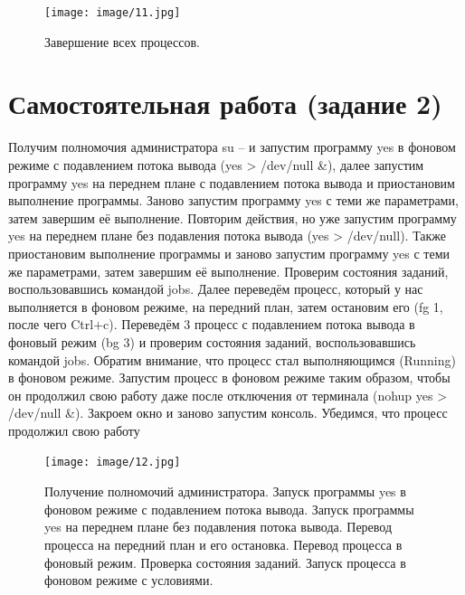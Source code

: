 \documentclass[
  english,
  russian,
  12pt,
  a4paper,
  DIV=11,
  numbers=noendperiod]{scrreprt}
\begin{document}
\begin{figure}

{\centering \texttt{[image: image/11.jpg]}

}

\caption{Завершение всех процессов.}

\end{figure}%

\section{Самостоятельная работа (задание
2)}\label{ux441ux430ux43cux43eux441ux442ux43eux44fux442ux435ux43bux44cux43dux430ux44f-ux440ux430ux431ux43eux442ux430-ux437ux430ux434ux430ux43dux438ux435-2}

Получим полномочия администратора su -- и запустим программу yes в
фоновом режиме с подавлением потока вывода (yes \textgreater{} /dev/null
\&), далее запустим программу yes на переднем плане с подавлением потока
вывода и приостановим выполнение программы. Заново запустим программу
yes с теми же параметрами, затем завершим её выполнение. Повторим
действия, но уже запустим программу yes на переднем плане без подавления
потока вывода (yes \textgreater{} /dev/null). Также приостановим
выполнение программы и заново запустим программу yes с теми же
параметрами, затем завершим её выполнение. Проверим состояния заданий,
воспользовавшись командой jobs. Далее переведём процесс, который у нас
выполняется в фоновом режиме, на передний план, затем остановим его (fg
1, после чего Ctrl+c). Переведём 3 процесс с подавлением потока вывода в
фоновый режим (bg 3) и проверим состояния заданий, воспользовавшись
командой jobs. Обратим внимание, что процесс стал выполняющимся
(Running) в фоновом режиме. Запустим процесс в фоновом режиме таким
образом, чтобы он продолжил свою работу даже после отключения от
терминала (nohup yes \textgreater{} /dev/null \&). Закроем окно и заново
запустим консоль. Убедимся, что процесс продолжил свою работу

\begin{figure}

{\centering \texttt{[image: image/12.jpg]}

}

\caption{Получение полномочий администратора. Запуск программы yes в
фоновом режиме с подавлением потока вывода. Запуск программы yes на
переднем плане без подавления потока вывода. Перевод процесса на
передний план и его остановка. Перевод процесса в фоновый режим.
Проверка состояния заданий. Запуск процесса в фоновом режиме с
условиями.}

\end{figure}%
\end{document}
